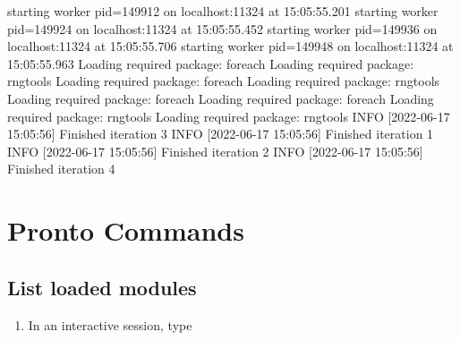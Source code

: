 \documentclass[
]{book}
\newenvironment{Shaded}{\begin{snugshade}}{\end{snugshade}}
\newcommand{\ExtensionTok}[1]{#1}
\newcommand{\NormalTok}[1]{#1}
\begin{document}
\begin{enumerate}
\begin{Shaded}
\begin{Highlighting}[]
\ExtensionTok{starting}\NormalTok{ worker pid=149912 on localhost:11324 at 15:05:55.201}
\ExtensionTok{starting}\NormalTok{ worker pid=149924 on localhost:11324 at 15:05:55.452}
\ExtensionTok{starting}\NormalTok{ worker pid=149936 on localhost:11324 at 15:05:55.706}
\ExtensionTok{starting}\NormalTok{ worker pid=149948 on localhost:11324 at 15:05:55.963}
\ExtensionTok{Loading}\NormalTok{ required package: foreach}
\ExtensionTok{Loading}\NormalTok{ required package: rngtools}
\ExtensionTok{Loading}\NormalTok{ required package: foreach}
\ExtensionTok{Loading}\NormalTok{ required package: rngtools}
\ExtensionTok{Loading}\NormalTok{ required package: foreach}
\ExtensionTok{Loading}\NormalTok{ required package: foreach}
\ExtensionTok{Loading}\NormalTok{ required package: rngtools}
\ExtensionTok{Loading}\NormalTok{ required package: rngtools}
\ExtensionTok{INFO}\NormalTok{ [2022{-}06{-}17 15:05:56] Finished iteration 3}
\ExtensionTok{INFO}\NormalTok{ [2022{-}06{-}17 15:05:56] Finished iteration 1}
\ExtensionTok{INFO}\NormalTok{ [2022{-}06{-}17 15:05:56] Finished iteration 2}
\ExtensionTok{INFO}\NormalTok{ [2022{-}06{-}17 15:05:56] Finished iteration 4}
\end{Highlighting}
\end{Shaded}
\end{enumerate}

\hypertarget{pronto-commands}{%
\section{Pronto Commands}\label{pronto-commands}}

\hypertarget{list-loaded-modules}{%
\subsection{List loaded modules}\label{list-loaded-modules}}

\begin{enumerate}
\def\labelenumi{\arabic{enumi}.}
\item
  In an interactive session, type

\begin{Shaded}
\end{Shaded}
\end{enumerate}
\end{document}
